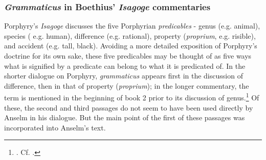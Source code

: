 \documentclass[]{article}
\begin{document}
\subsubsection{\textit{Grammaticus} in Boethius' \textit{Isagoge} commentaries}
Porphyry's \textit{Isagoge} discusses the five Porphyrian \textit{predicables} - genus (e.g. animal), species ( e.g. human), difference (e.g. rational), property (\textit{proprium}, e.g. risible), and accident (e.g. tall, black). Avoiding a more detailed exposition of Porphyry's doctrine for its own sake, these five predicables may be thought of as five ways what is signified by a predicate can belong to what it is predicated of. In the shorter dialogue on Porphyry, \textit{grammaticus} appears first in the discussion of difference, then in that of property (\textit{proprium}); in the longer commentary, the term is mentioned in the beginning of book 2 prior to its discussion of genus.\footnote{\cite[BDP 54D-55C]{BDP} \cite[BCP 87A-B]{BCP}. Cf. \cite[BC189D-190B]{BC}.} Of these, the second and third passages do not seem to have been used directly by Anselm in his dialogue. But the main point of the first of these passages was incorporated into Anselm's text.
\end{document}
